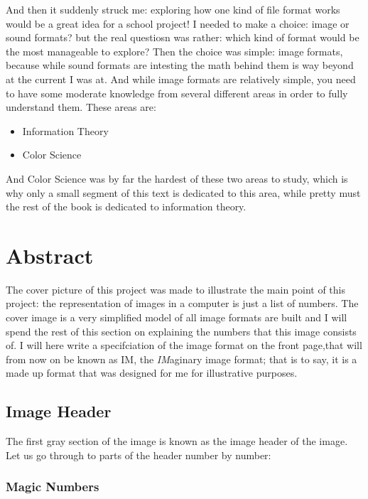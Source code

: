 And then it suddenly struck me: exploring how one kind of file format
works would be a great idea for a school project! I needed to make a
choice: image or sound formats? but the real questiosn was rather:
which kind of format would be the most manageable to explore? Then the
choice was simple: image formats, because while sound formats are
intesting the math behind them is way beyond at the current I was
at. And while image formats are relatively simple, you need to have
some moderate knowledge from several different areas in order to fully
understand them. These areas are:

\begin{itemize}
\item Information Theory
\item Color Science
\end{itemize}

And Color Science was by far the hardest of these two areas to study,
which is why only a small segment of this text is dedicated to this
area, while pretty must the rest of the book is dedicated to information
theory.

\section{Abstract}

The cover picture of this project was made to illustrate the main
point of this project: the representation of images in a computer is
just a list of numbers. The cover image is a very simplified model of
all image formats are built and I will spend the rest of this section
on explaining the numbers that this image consists of. I will here
write a specifciation of the image format on the front page,that will
from now on be known as IM, the \textit{IM}aginary image format; that
is to say, it is a made up format that was designed for me for
illustrative purposes.

\subsection{Image Header}

The first gray section of the image is known as the image header of
the image. Let us go through to parts of the header number by number:

\subsubsection{Magic Numbers}

